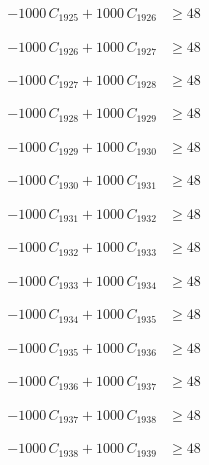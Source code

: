 \documentclass[a4paper,11pt]{article}
\begin{document}
\begin{align}
-1000\,C_{1925} + 1000\,C_{1926} &\geq 48 \nonumber
\end{align}

\begin{align}
-1000\,C_{1926} + 1000\,C_{1927} &\geq 48 \nonumber
\end{align}

\begin{align}
-1000\,C_{1927} + 1000\,C_{1928} &\geq 48 \nonumber
\end{align}

\begin{align}
-1000\,C_{1928} + 1000\,C_{1929} &\geq 48 \nonumber
\end{align}

\begin{align}
-1000\,C_{1929} + 1000\,C_{1930} &\geq 48 \nonumber
\end{align}

\begin{align}
-1000\,C_{1930} + 1000\,C_{1931} &\geq 48 \nonumber
\end{align}

\begin{align}
-1000\,C_{1931} + 1000\,C_{1932} &\geq 48 \nonumber
\end{align}

\begin{align}
-1000\,C_{1932} + 1000\,C_{1933} &\geq 48 \nonumber
\end{align}

\begin{align}
-1000\,C_{1933} + 1000\,C_{1934} &\geq 48 \nonumber
\end{align}

\begin{align}
-1000\,C_{1934} + 1000\,C_{1935} &\geq 48 \nonumber
\end{align}

\begin{align}
-1000\,C_{1935} + 1000\,C_{1936} &\geq 48 \nonumber
\end{align}

\begin{align}
-1000\,C_{1936} + 1000\,C_{1937} &\geq 48 \nonumber
\end{align}

\begin{align}
-1000\,C_{1937} + 1000\,C_{1938} &\geq 48 \nonumber
\end{align}

\begin{align}
-1000\,C_{1938} + 1000\,C_{1939} &\geq 48 \nonumber
\end{align}
\end{document}
